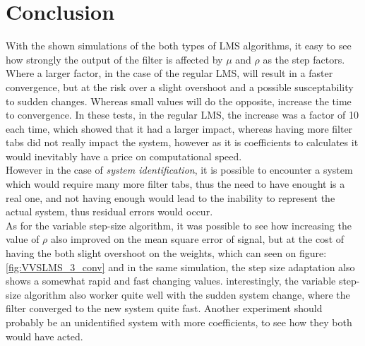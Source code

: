 \section{Conclusion}
With the shown simulations of the both types of LMS algorithms, it easy to see how
strongly the output of the filter is affected by $\mu$ and $\rho$ as the step factors. 
Where a larger factor, in the case of the regular LMS, will result in a faster convergence, but
at the risk over a slight overshoot and a possible susceptability to sudden changes. Whereas
small values will do the opposite, increase the time to convergence. In these tests, in the regular 
LMS, the increase was a factor of 10 each time, which showed that it had a larger impact, whereas 
having more filter tabs did not really impact the system, however as it is coefficients to calculates
it would inevitably have a price on computational speed.\\

However in the case of \textit{system identification}, it is possible to encounter a system 
which would require many more filter tabs, thus the need to have enought is a real one, and not 
having enough would lead to the inability to represent the actual system, thus residual errors would occur.\\

As for the variable step-size algorithm, it was possible to see how increasing the value of $\rho$ also
improved on the mean square error of signal, but at the cost of having the both slight overshoot
on the weights, which can seen on figure: \ref{fig:VVSLMS_3_conv} and in the same simulation, the
step size adaptation also shows a somewhat rapid and fast changing values. interestingly, 
the variable step-size algorithm also worker quite well with the sudden system change, where the filter
converged to the new system quite fast. Another experiment should probably be an unidentified system
with more coefficients, to see how they both would have acted.


